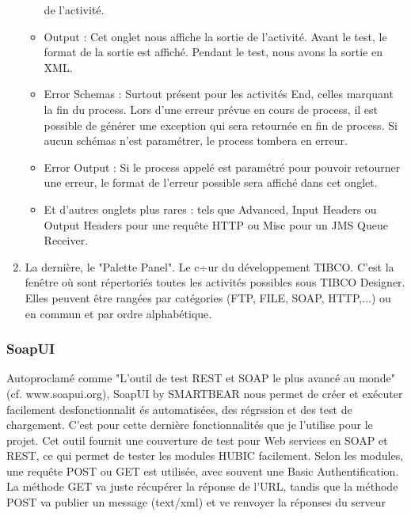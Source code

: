 \begin{enumerate}
\begin{itemize}
	de l'activité.
	\item Output : Cet onglet nous affiche la sortie de l'activité. Avant le test, le format de la
	sortie est affiché. Pendant le test, nous avons la sortie en XML.
	\item Error Schemas : Surtout présent pour les activités End, celles marquant la fin du
	process. Lors d'une erreur prévue en cours de process, il est possible de générer une
	exception qui sera retournée en fin de process. Si aucun schémas n'est paramétrer,
	le process tombera en erreur.
	\item Error Output : Si le process appelé est paramétré pour pouvoir retourner une erreur,
	le format de l'erreur possible sera affiché dans cet onglet.
	\item Et d'autres onglets plus rares : tels que Advanced, Input Headers ou Output Headers
	pour une requête HTTP ou Misc pour un JMS Queue Receiver.
\end{itemize}
\item La dernière, le "Palette Panel". Le c÷ur du développement TIBCO. C'est la fenêtre
où sont répertoriés toutes les activités possibles sous TIBCO Designer. Elles peuvent
être rangées par catégories (FTP, FILE, SOAP, HTTP,...) ou en commun et par ordre
alphabétique.
\end{enumerate}

\subsubsection{SoapUI}
Autoproclamé comme "L'outil de test REST et SOAP le plus avancé au monde" (cf.
www.soapui.org), SoapUI by SMARTBEAR nous permet de créer et exécuter facilement desfonctionnalit
és automatisées, des régrssion et des test de chargement. C'est pour cette dernière
fonctionnalités que je l'utilise pour le projet. Cet outil fournit une couverture de test pour Web
services en SOAP et REST, ce qui permet de tester les modules HUBIC facilement. Selon les
modules, une requête POST ou GET est utilisée, avec souvent une Basic Authentification. La
méthode GET va juste récupérer la réponse de l'URL, tandis que la méthode POST va publier
un message (text/xml) et ve renvoyer la réponses du serveur

